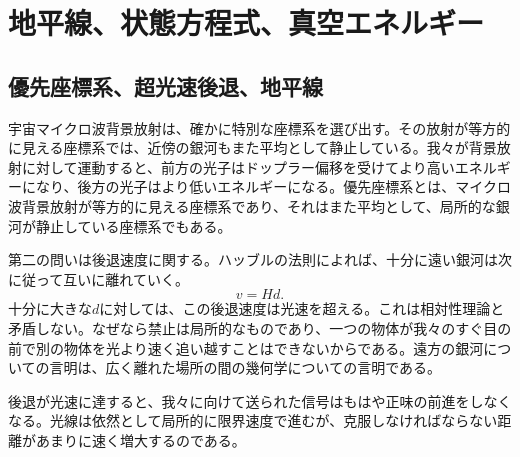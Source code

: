 \chapter{地平線、状態方程式、真空エネルギー}

\section{優先座標系、超光速後退、地平線}

宇宙マイクロ波背景放射は、確かに特別な座標系を選び出す。その放射が等方的に見える座標系では、近傍の銀河もまた平均として静止している。我々が背景放射に対して運動すると、前方の光子はドップラー偏移を受けてより高いエネルギーになり、後方の光子はより低いエネルギーになる。優先座標系とは、マイクロ波背景放射が等方的に見える座標系であり、それはまた平均として、局所的な銀河が静止している座標系でもある。

\begin{classroomqa}
\end{classroomqa}

第二の問いは後退速度に関する。ハッブルの法則によれば、十分に遠い銀河は次に従って互いに離れていく。
\begin{equation}
v = H d .
\end{equation}
十分に大きな\(d\)に対しては、この後退速度は光速を超える。これは相対性理論と矛盾しない。なぜなら禁止は局所的なものであり、一つの物体が我々のすぐ目の前で別の物体を光より速く追い越すことはできないからである。遠方の銀河についての言明は、広く離れた場所の間の幾何学についての言明である。

\begin{classroomqa}
\end{classroomqa}

後退が光速に達すると、我々に向けて送られた信号はもはや正味の前進をしなくなる。光線は依然として局所的に限界速度で進むが、克服しなければならない距離があまりに速く増大するのである。

